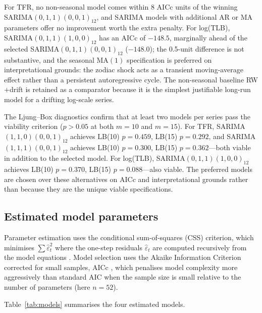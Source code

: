 \documentclass[12pt,a4paper]{article}
\begin{document}
For TFR, no non-seasonal model comes within 8 AICc units of the winning
SARIMA$(0,1,1)(0,0,1)_{12}$, and SARIMA models with additional AR or MA parameters offer
no improvement worth the extra penalty. For log(TLB), SARIMA$(0,1,1)(1,0,0)_{12}$ has an
AICc of $-148.5$, marginally ahead of the selected SARIMA$(0,1,1)(0,0,1)_{12}$ ($-148.0$);
the 0.5-unit difference is not substantive, and the seasonal MA$(1)$ specification is
preferred on interpretational grounds: the zodiac shock acts as a transient moving-average
effect rather than a persistent autoregressive cycle. The non-seasonal baseline
RW$+$drift is retained as a comparator because it is the simplest justifiable
long-run model for a drifting log-scale series.

The Ljung--Box diagnostics confirm that at least two models per series pass the
viability criterion ($p>0.05$ at both $m=10$ and $m=15$). For TFR,
SARIMA$(1,1,0)(0,0,1)_{12}$ achieves LB(10) $p=0.459$, LB(15) $p=0.292$, and
SARIMA$(1,1,1)(0,0,1)_{12}$ achieves LB(10) $p=0.300$, LB(15) $p=0.362$---both
viable in addition to the selected model. For log(TLB),
SARIMA$(0,1,1)(1,0,0)_{12}$ achieves LB(10) $p=0.370$, LB(15) $p=0.088$---also
viable. The preferred models are chosen over these alternatives on AICc and
interpretational grounds rather than because they are the unique viable
specifications.

\subsection{Estimated model parameters}

Parameter estimation uses the conditional sum-of-squares (CSS) criterion, which
minimises $\sum\hat\varepsilon_t^2$ where the one-step residuals $\hat\varepsilon_t$
are computed recursively from the model equations \citep{box2015}. Model selection
uses the Akaike Information Criterion corrected for small samples, AICc
\citep{hurvich1989}, which penalises model complexity more aggressively than standard
AIC when the sample size is small relative to the number of parameters (here $n=52$).

Table~\ref{tab:models} summarises the four estimated models.
\end{document}
